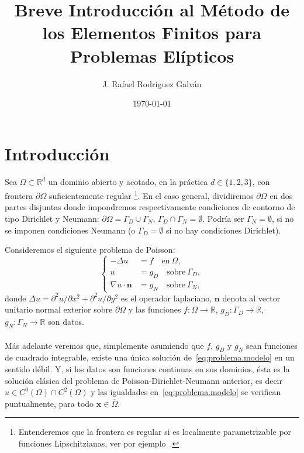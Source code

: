 \documentclass[11pt]{article}
\title{Breve Introducción al Método de los Elementos Finitos para Problemas Elípticos}
\author{J. Rafael Rodríguez Galván}
\date{\versiondate\today}
\theoremstyle{plain}
\theoremstyle{definition}
\newcounter{stepnum}[section]
\newcommand{\step}[1][]{\bigskip\noindent\textbf{\thesection.\refstepcounter{stepnum}\thestepnum}.\enspace{#1}}
\renewcommand{\step}[1][]{\paragraph{#1}\hspace{-1.1em}}
\newcommand{\R}{\ensuremath{\mathbb{R}}}
\newcommand{\xx}{\ensuremath{\mathbf{x}}\xspace}
\newcommand{\nn}{\ensuremath{\mathbf{n}}\xspace}
\newcommand{\grad}{\ensuremath{\nabla}}
\newcommand{\en}{\quad\text{en}\ }
\newcommand{\sobre}{\quad\text{sobre}\ }
\begin{document}
\maketitle

\section{Introducción}

\step
Sea  $\Omega\subset\R^d$ un dominio abierto y acotado, en la práctica $d\in\{1,2,3\}$, con frontera $\partial\Omega$ suficientemente regular%
\footnote{Entenderemos que la frontera es regular si es localmente parametrizable por funciones Lipschitzianas, ver por ejemplo~\cite{Ern-Guermond:04}.}.
En el caso general, dividiremos $\partial\Omega$ en dos partes disjuntas donde impondremos respectivamente condiciones de contorno de tipo Dirichlet y Neumann: $\partial\Omega = \Gamma_D\cup\Gamma_N$,  $\Gamma_D\cap\Gamma_N=\emptyset$.  Podría ser $\Gamma_N=\emptyset$, si no se imponen condiciones Neumann (o $\Gamma_D=\emptyset$ si no hay condiciones Dirichlet).

Consideremos el siguiente problema de Poisson:
\begin{equation}
  \left\{
    \begin{aligned}
      -\Delta u &= f \en{\Omega}, \\
      u&=g_D \sobre{\Gamma_D}, \\
      \grad u\cdot\nn & = g_N \sobre{\Gamma_N},
    \end{aligned}
  \right.
  \label{eq:problema.modelo}
\end{equation}
donde $\Delta u = \partial^ 2 u/\partial x^2 + \partial^ 2 u/\partial y^2$ es el operador laplaciano, $\nn$ denota al vector unitario normal exterior sobre $\partial\Omega$  y las funciones $f:\Omega\to\R$, $g_D:\Gamma_D\to\R$, $g_N:\Gamma_N\to\R$ son datos.

\step
Más adelante veremos que, simplemente asumiendo que $f$, $g_D$ y $g_N$ sean funciones de cuadrado integrable, existe una única solución de~\eqref{eq:problema.modelo} en un sentido débil. Y,  si los datos son funciones continuas en sus dominios, ésta es la solución clásica del problema de Poisson-Dirichlet-Neumann anterior, es decir $u\in C^0(\Omega)\cap C^2(\Omega)$ y las igualdades en~\eqref{eq:problema.modelo} se verifican puntualmente, para todo $\xx\in\overline\Omega$.
\end{document}
